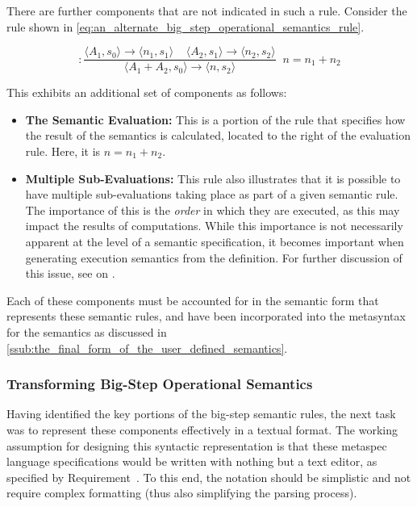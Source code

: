 There are further components that are not indicated in such a rule. 
Consider the rule shown in \autoref{eq:an_alternate_big_step_operational_semantics_rule}.

\begin{equation}
    [+] : \frac{\langle A_1, s_0\rangle \to \langle n_1, s_1\rangle \;\;\;\; \langle A_2, s_1 \rangle \to \langle n_2, s_2\rangle}{\langle A_1 + A_2, s_0 \rangle \to \langle n, s_2 \rangle}\;\; n = n_1 + n_2
    \label{eq:an_alternate_big_step_operational_semantics_rule}
\end{equation}

This exhibits an additional set of components as follows:
\begin{itemize}
    \item \textbf{The Semantic Evaluation:} This is a portion of the rule that specifies how the result of the semantics is calculated, located to the right of the evaluation rule. 
    Here, it is $n = n_1 + n_2$.
    \item \textbf{Multiple Sub-Evaluations:} This rule also illustrates that it is possible to have multiple sub-evaluations taking place as part of a given semantic rule. 
    The importance of this is the \textit{order} in which they are executed, as this may impact the results of computations.
    While this importance is not necessarily apparent at the level of a semantic specification, it becomes important when generating execution semantics from the definition. 
    For further discussion of this issue, see  on .
\end{itemize}

Each of these components must be accounted for in the semantic form that represents these semantic rules, and have been incorporated into the metasyntax for the semantics as discussed in \autoref{ssub:the_final_form_of_the_user_defined_semantics}.


\subsubsection{Transforming Big-Step Operational Semantics} %
\label{ssub:transforming_big_step_operational_semantics}
Having identified the key portions of the big-step semantic rules, the next task was to represent these components effectively in a textual format. 
The working assumption for designing this syntactic representation is that these \gls{metaspec} language specifications would be written with nothing but a text editor, as specified by Requirement~.
To this end, the notation should be simplistic and not require complex formatting (thus also simplifying the parsing process). \\

